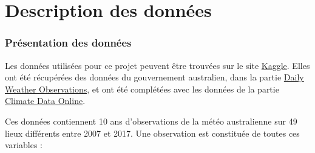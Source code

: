 \documentclass{article}
\begin{document}
\newpage
\part{Description des données}

\section{Présentation des données}

Les données utilisées pour ce projet peuvent être trouvées sur le site \href{https://www.kaggle.com/jsphyg/weather-dataset-rattle-package}{Kaggle}. Elles ont été récupérées des données du gouvernement australien, dans la partie \href{http://www.bom.gov.au/climate/dwo}{Daily Weather Observations}, et ont été complétées avec les données de la partie  \href{http://www.bom.gov.au/climate/data}{Climate Data Online}.

Ces données contiennent 10 ans d'observations de la météo australienne sur 49 lieux différents entre 2007 et 2017. Une observation est constituée de toutes ces variables : 
\end{document}
